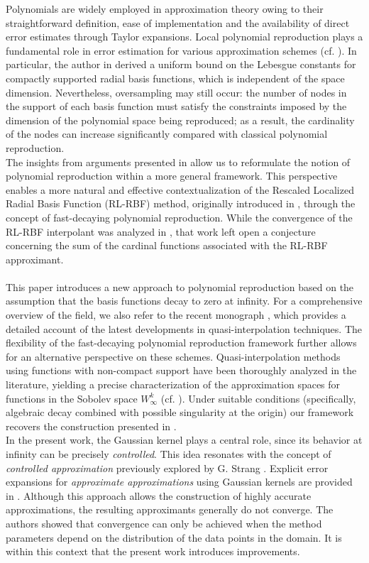 \documentclass{drna}
\begin{document}
Polynomials are widely employed in approximation theory owing to their straightforward definition, ease of implementation and the availability of direct error estimates through Taylor expansions. Local polynomial reproduction plays a fundamental role in error estimation for various approximation schemes (cf. \cite{schaback_1997, Flyer2006}). In particular, the author in \cite{wendland_2001} derived a uniform bound on the Lebesgue constants for compactly supported radial basis functions, which is independent of the space dimension. Nevertheless, oversampling may still occur: the number of nodes in the support of each basis function must satisfy the constraints imposed by the dimension of the polynomial space being reproduced; as a result, the cardinality of the nodes can increase significantly compared with classical polynomial reproduction.
\\
The insights from arguments presented in \cite{demarchi2020} allow us to reformulate the notion of polynomial reproduction within a more general framework. This perspective enables a more natural and effective contextualization of the Rescaled Localized Radial Basis Function (RL-RBF) method, originally introduced in \cite{deparis_2014}, through the concept of fast-decaying polynomial reproduction. While the convergence of the RL-RBF interpolant was analyzed in \cite{demarchi2020}, that work left open a conjecture concerning the sum of the cardinal functions associated with the RL-RBF approximant.
\\
\\
This paper introduces a new approach to polynomial reproduction based on the assumption that the basis functions decay to zero at infinity. For a comprehensive overview of the field, we also refer to the recent monograph \cite{Buhmann2022}, which provides a detailed account of the latest developments in quasi-interpolation techniques. The flexibility of the fast-decaying polynomial reproduction framework further allows for an alternative perspective on these schemes. Quasi-interpolation methods using functions with non-compact support have been thoroughly analyzed in the literature, yielding a precise characterization of the approximation spaces for functions in the Sobolev space $W^{k}_{\infty}$ (cf. \cite{LightCheney1992}). Under suitable conditions (specifically, algebraic decay combined with possible singularity at the origin) our framework recovers the construction presented in \cite{LightCheney1992}.
\\
In the present work, the Gaussian kernel plays a central role, since its behavior at infinity can be precisely \textit{controlled}. This idea resonates with the concept of \textit{controlled approximation} previously explored by G. Strang \cite{Strang70}. Explicit error expansions for \textit{approximate approximations} using Gaussian kernels are provided in \cite{MazyaSchmidt1996}. Although this approach allows the construction of highly accurate approximations, the resulting approximants generally do not converge. The authors showed that convergence can only be achieved when the method parameters depend on the distribution of the data points in the domain. It is within this context that the present work introduces improvements.
\end{document}
